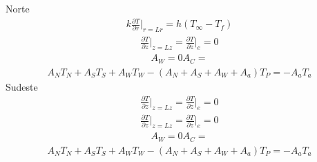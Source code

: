 \documentclass[
	12pt,				%
	openright,			%
	oneside,			%
	a4paper,			%
	english,			%
	french,				%
	spanish,			%
	brazil				%
	]{abntex2}
\begin{document}
Norte
\begin{gather}     
k\frac{\partial T}{\partial r}\biggr\rvert_{r=Lr}=h(T_\infty-T_f)
\end{gather}
\begin{gather}
\frac{\partial T}{\partial z}\biggr\rvert_{z=Lz}=
\frac{\partial T}{\partial z}\biggr\rvert_{e}=0
\end{gather}
\begin{gather}
A_W=0 
A_C= 
\end{gather}
\begin{gather}
A_N T_N+A_S T_S+A_W T_W-(A_N+A_S+A_W+A_a)T_P=-A_a T_a
\end{gather} 
Sudeste
\begin{gather}     
\frac{\partial T}{\partial z}\biggr\rvert_{z=Lz}=
\frac{\partial T}{\partial z}\biggr\rvert_{e}=0
\end{gather}
\begin{gather}
\frac{\partial T}{\partial z}\biggr\rvert_{z=Lz}=
\frac{\partial T}{\partial z}\biggr\rvert_{e}=0
\end{gather}
\begin{gather}
A_W=0 
A_C= 
\end{gather}
\begin{gather}
A_N T_N+A_S T_S+A_W T_W-(A_N+A_S+A_W+A_a)T_P=-A_a T_a
\end{gather} 
\end{document}

